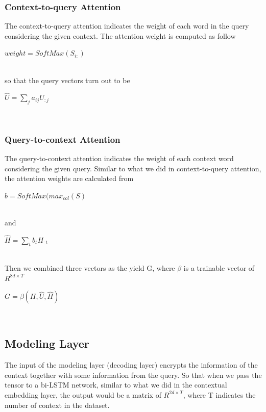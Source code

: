 \documentclass{article} %
\begin{document}
\subsubsection{Context-to-query Attention}

The context-to-query attention indicates the weight of each word in the query considering the given context. The attention weight is computed as follow\\
\newline
\centerline{$weight=SoftMax(S_{i:})$}\\
\newline
so that the query vectors turn out to be\\
\newline
\centerline{$\hat{U}=\sum_j a_{ij}U_{:j}$}\\

\subsubsection{Query-to-context Attention}

The query-to-context attention indicates the weight of each context word considering the given query. Similar to what we did in context-to-query attention, the attention weights are calculated from\\
\newline
\centerline{$b=SoftMax(max_{col}(S)$}\\
\newline
and
\newline
\centerline{$\hat{H}=\sum_tb_tH_{:t}$}\\
\newline
Then we combined three vectors as the yield G, where $\beta$ is a trainable vector of $R^{8d\times T}$\\
\newline
\centerline{$G=\beta (H, \hat{U}, \hat{H})$}\\

\subsection{Modeling Layer}

The input of the modeling layer (decoding layer) encrypts the information of the context together with some information from the query. So that when we pass the tensor to a bi-LSTM network, similar to what we did in the contextual embedding layer, the output would be a matrix of $R^{2d\times T}$, where T indicates the number of context in the dataset.
\end{document}
